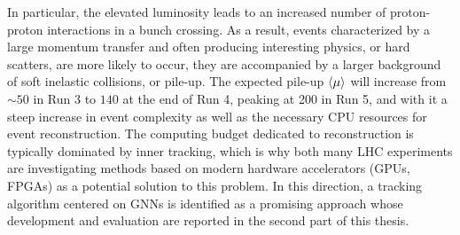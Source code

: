 In particular, the elevated luminosity leads to an increased number of proton-proton interactions in a bunch crossing.
As a result, events characterized by a large momentum transfer and often producing interesting physics, or hard scatters, are more likely to occur, they are accompanied by a larger background of soft inelastic collisions, or pile-up. 
The expected pile-up $\expval{\mu}$ will increase from $\sim50$ in Run 3 to $140$ at the end of Run 4, peaking at 200 in Run 5, and with it a steep increase in event complexity as well as the necessary CPU resources for event reconstruction.
The computing budget dedicated to reconstruction is typically dominated by inner tracking, which is why both many LHC experiments are investigating methods based on modern hardware accelerators (GPUs, FPGAs) as a potential solution to this problem. 
In this direction, a tracking algorithm centered on GNNs is identified as a promising approach whose development and evaluation are reported in the second part of this thesis. 


